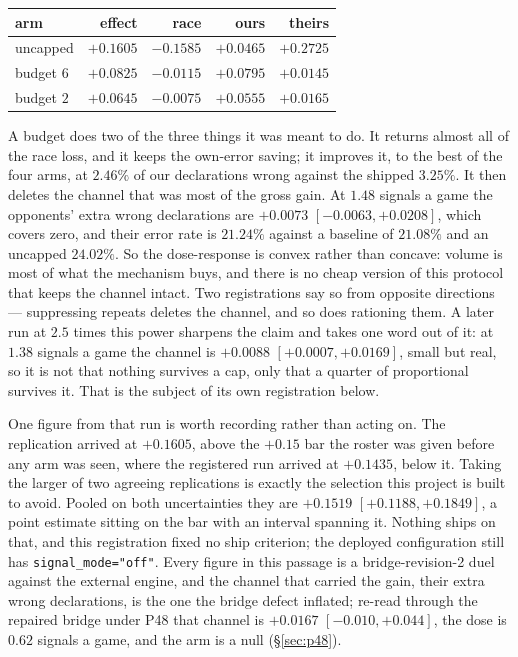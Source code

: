\documentclass[11pt,letterpaper]{article}
\begin{document}
\begin{center}
\small
\begin{tabular}{lrrrr}
\toprule
arm & effect & race & ours & theirs \\
\midrule
uncapped   & $+0.1605$ & $-0.1585$ & $+0.0465$ & $+0.2725$ \\
budget $6$ & $+0.0825$ & $-0.0115$ & $+0.0795$ & $+0.0145$ \\
budget $2$ & $+0.0645$ & $-0.0075$ & $+0.0555$ & $+0.0165$ \\
\bottomrule
\end{tabular}
\end{center}

\noindent A budget does two of the three things it was meant to do. It returns
almost all of the race loss, and it keeps the own-error saving; it improves it,
to the best of the four arms, at $2.46\%$ of our declarations wrong against the
shipped $3.25\%$. It then deletes the channel that was most of the gross gain.
At $1.48$ signals a game the opponents' extra wrong declarations are $+0.0073$
$[-0.0063, +0.0208]$, which covers zero, and their error rate is $21.24\%$
against a baseline of $21.08\%$ and an uncapped $24.02\%$. So the dose-response
is convex rather than concave: volume is most of what the mechanism buys, and
there is no cheap version of this protocol that keeps the channel intact. Two
registrations say so from opposite directions --- suppressing repeats deletes
the channel, and so does rationing them. A later run at $2.5$ times this power
sharpens the claim and takes one word out of it: at $1.38$ signals a game the
channel is $+0.0088$ $[+0.0007, +0.0169]$, small but real, so it is not that
nothing survives a cap, only that a quarter of proportional survives it. That
is the subject of its own registration below.

One figure from that run is worth recording rather than acting on. The
replication arrived at $+0.1605$, above the $+0.15$ bar the roster was given
before any arm was seen, where the registered run arrived at $+0.1435$, below
it. Taking the larger of two agreeing replications is exactly the selection
this project is built to avoid. Pooled on both uncertainties they are $+0.1519$
$[+0.1188, +0.1849]$, a point estimate sitting on the bar with an interval
spanning it. Nothing ships on that, and this registration fixed no ship
criterion; the deployed configuration still has \texttt{signal\_mode="off"}.
Every figure in this passage is a bridge-revision-2 duel against
the external engine, and the channel that carried the gain, their extra wrong
declarations, is the one the bridge defect inflated; re-read through the
repaired bridge under P48 that channel is $+0.0167$ $[-0.010, +0.044]$, the
dose is $0.62$ signals a game, and the arm is a null (\S\ref{sec:p48}).
\end{document}
